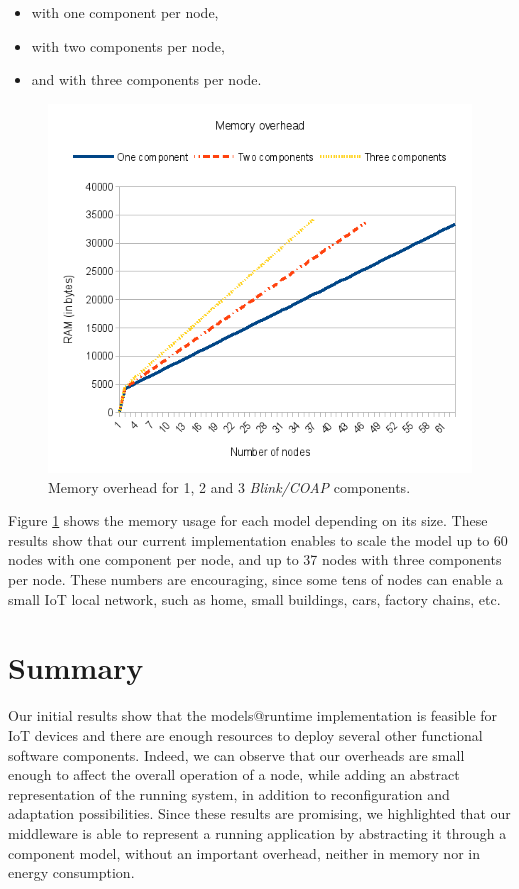 \begin{itemize}
	\item with one component per node, 
	\item with two components per node,
	\item and with three components per node.
\end{itemize}

\begin{figure}[h]
	\centering
	\includegraphics[width=0.7\columnwidth]{chapters/modelsAtRuntimeContiki.images/MemoryOverhead3Nodes.png}
	\caption{Memory overhead for 1, 2 and 3 \emph{Blink/COAP} components.} \label{fig:MemUsedBlinkComps}
\end{figure}


Figure \ref{fig:MemUsedBlinkComps} shows the memory usage for each model depending on its size.
These results show that our current implementation enables to scale the model up to 60 nodes with one component per node, and up to 37 nodes with three components per node. These numbers are encouraging, since some tens of nodes can enable a small IoT local network, such as home, small buildings, cars, factory chains, etc.

\section{Summary}
Our initial results show that the models@runtime implementation is feasible for IoT devices and there are enough resources to deploy several other functional software components.
Indeed, we can observe that our overheads are small enough to affect the overall operation of a node, while adding an abstract representation of the running system, in addition to reconfiguration and adaptation possibilities.
Since these results are promising, we highlighted that our middleware is able to represent a running application by abstracting it through a component model, without an important overhead, neither in memory nor in energy consumption.


